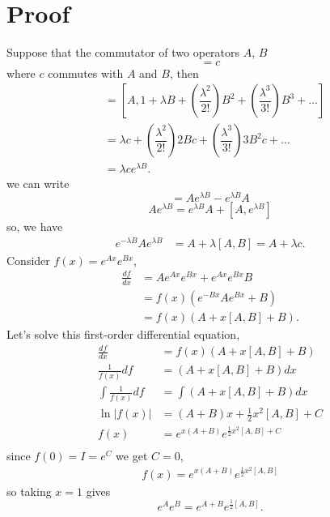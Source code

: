 \documentclass[12pt]{article}
\begin{document}
\section*{Proof}
Suppose that the commutator of two operators $A$, $B$
\begin{equation}
    [A,B]=c
\end{equation}
where $c$ commutes with $A$ and $B$, then
\begin{align}
    [A,e^{\lambda B}] &= \left[A,1+\lambda B+ \left(\dfrac{\lambda^2}{2!} \right)B^2+ \left(\dfrac{\lambda^3}{3!}\right)B^3+\dots\right] \\[5pt] &= \lambda c+ \left(\dfrac{\lambda^2}{2!}\right)2Bc+ \left(\dfrac{\lambda^3}{3!}\right)3B^2c+\dots \\[5pt] &= \lambda ce^{\lambda B}.
\end{align}
we can write
\begin{equation*}
    [A,e^{\lambda B}] = Ae^{\lambda B} - e^{\lambda B}A
\end{equation*}
\begin{equation*}
     Ae^{\lambda B} = e^{\lambda B}A + [A,e^{\lambda B}] 
\end{equation*}
so, we have
\begin{align} 
    e^{-\lambda B}Ae^{\lambda B} &= A+\lambda[A,B] = A+\lambda c. 
\end{align}
Consider $f(x)=e^{Ax}e^{Bx}$,
\begin{align*} 
    \frac{df}{dx} &=Ae^{Ax}e^{Bx}+e^{Ax}e^{Bx}B \\[4pt] &=f(x)(e^{-Bx}Ae^{Bx}+B) \\[4pt] &=f(x)(A+x[A,B]+B). 
\end{align*}
Let's solve this first-order differential equation,
\begin{align*}
    \frac{df}{dx} &= f(x)(A+x[A,B]+B) \\
    \frac{1}{f(x)}df &= (A+x[A,B]+B)dx \\
    \int \frac{1}{f(x)}df &= \int (A+x[A,B]+B)dx \\
    \ln{|f(x)|} &= (A+B)x + \frac{1}{2}x^{2}[A,B] + C \\
    f(x) &= e^{x(A+B)}e^{\frac{1}{2}x^2[A,B] + C} \\
\end{align*}
since $f(0) = I = e^{C}$ we get $C=0$,
\begin{align}
    f(x)=e^{x(A+B)}e^{\frac{1}{2}x^2[A,B]} \nonumber
\end{align}
so taking $x=1$ gives
\begin{equation*}
    e^Ae^B=e^{A+B}e^{\frac{1}{2}[A,B]}.
\end{equation*}
\end{document}
